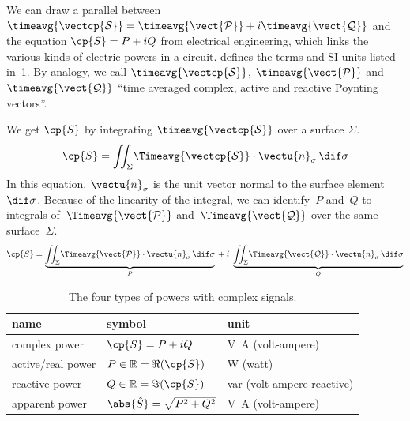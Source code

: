 We can draw a parallel between
$
    \timeavg{\vectcp{\mathcal{S}}}
    =
    \timeavg{\vect{\mathcal{P}}}
    +
    i
    \timeavg{\vect{\mathcal{Q}}}
$
and the equation
$
    \cp{S} = P + iQ
$
from electrical engineering, which links the various kinds of electric powers in a circuit.
 \cite{IEEE2002dictionary} defines the terms and SI units listed in~\cref{tab:complex_powers}.
By analogy, we call $\timeavg{\vectcp{\mathcal{S}}}$,
$\timeavg{\vect{\mathcal{P}}}$ and
$\timeavg{\vect{\mathcal{Q}}}$ ``time averaged complex, active and reactive Poynting vectors''.

We get $\cp{S}$ by integrating $\timeavg{\vectcp{\mathcal{S}}}$ over a surface $\Sigma$.
\begin{equation}
    \cp{S}
    =
    \iint_\Sigma
    \!
    \Timeavg{\vectcp{\mathcal{S}}}
    \cdot
    \vectu{n}_\sigma
    \,
    \dif\sigma
    \label{eq:complex_power_from_poynting_vector}
\end{equation}
In this equation, $\vectu{n}_\sigma$ is the unit vector normal to the surface element~$\dif\sigma$.
Because of the linearity of the integral, we can identify~$P$ and~$Q$
to integrals of~$\Timeavg{\vect{\mathcal{P}}}$ and~$\Timeavg{\vect{\mathcal{Q}}}$
over the same surface~$\Sigma$.
\begin{equation}
    \cp{S}
    =
    \underbrace{
        \iint_\Sigma
        \!
        \Timeavg{\vect{\mathcal{P}}}
        \cdot
        \vectu{n}_\sigma
        \,
        \dif\sigma
    }_{P}
    \:
    +
    \:
    i
    \;
    \underbrace{
        \iint_\Sigma
        \!
        \Timeavg{\vect{\mathcal{Q}}}
        \cdot
        \vectu{n}_\sigma
        \,
        \dif\sigma
    }_{Q}
    \label{eq:active_reactive_power_from_poynting_vector}
\end{equation}

\begin{table}[hbtp]
    \centering
    \begin{tabular}{lll}
        \toprule
        name & symbol & unit\\
        \midrule
        complex power     & $\cp{S} = P + iQ$\quad & \si{\volt\ampere} (volt-ampere) \\
        active/real power & $P \in \mathbb{R} = \Re(\cp{S})$\quad & \si{\watt} (watt) \\
        reactive power    & $Q \in \mathbb{R} = \Im(\cp{S})$\quad & \si{var} (volt-ampere-reactive) \\
        apparent power    & $\abs{\hat{S}} = \sqrt{P^2 + Q^2}$\quad & \si{\volt\ampere} (volt-ampere) \\
        \bottomrule
    \end{tabular}
    \caption{The four types of powers with complex signals.}
    \label{tab:complex_powers}
\end{table}

